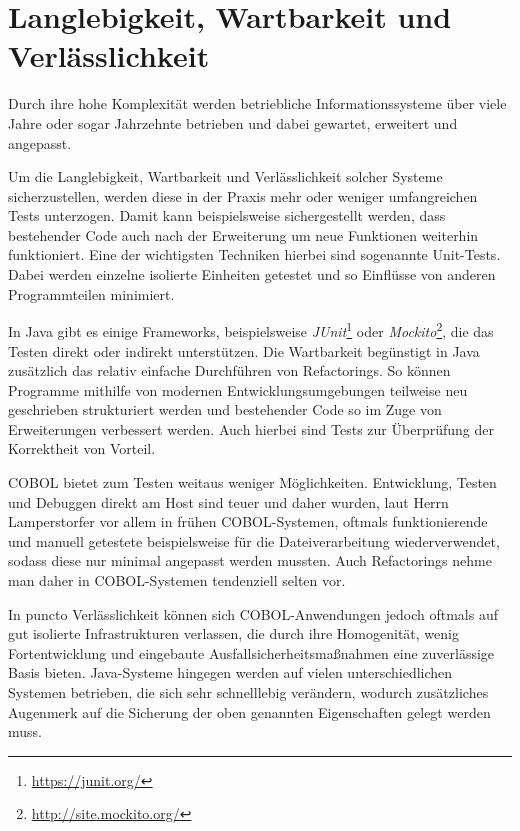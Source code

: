 \section{Langlebigkeit, Wartbarkeit und Verlässlichkeit} \label{verlaesslichkeit}

Durch ihre hohe Komplexität werden betriebliche Informationssysteme \idR über viele Jahre oder sogar Jahrzehnte betrieben und dabei gewartet,  erweitert und angepasst. 

Um die Langlebigkeit, Wartbarkeit und Verlässlichkeit solcher Systeme sicherzustellen, werden diese in der Praxis mehr oder weniger umfangreichen Tests unterzogen. Damit kann beispielsweise sichergestellt werden, dass bestehender Code auch nach der Erweiterung um neue Funktionen weiterhin funktioniert. Eine der wichtigsten Techniken hierbei sind sogenannte Unit-Tests. Dabei werden einzelne isolierte Einheiten getestet und so Einflüsse von anderen Programmteilen minimiert. 

In Java gibt es einige Frameworks, beispielsweise \textit{JUnit}\footnote{\url{https://junit.org/}} oder \textit{Mockito}\footnote{\url{http://site.mockito.org/}}, die das Testen direkt oder indirekt unterstützen. Die Wartbarkeit begünstigt in Java zusätzlich das relativ einfache Durchführen von Refactorings. So können Programme mithilfe von modernen Entwicklungsumgebungen teilweise neu geschrieben \bzw strukturiert werden und bestehender Code so im Zuge von Erweiterungen verbessert werden. Auch hierbei sind Tests zur Überprüfung der Korrektheit von Vorteil. 

COBOL bietet zum Testen weitaus weniger Möglichkeiten. Entwicklung, Testen und Debuggen direkt am Host sind teuer und daher wurden, laut Herrn Lamperstorfer vor allem in frühen COBOL-Systemen, oftmals funktionierende und manuell getestete  beispielsweise für die Dateiverarbeitung wiederverwendet, sodass diese nur minimal angepasst werden mussten. Auch Refactorings nehme man daher in COBOL-Systemen tendenziell selten vor.

In puncto Verlässlichkeit können sich COBOL-Anwendungen jedoch oftmals auf gut isolierte Infrastrukturen verlassen, die durch ihre Homogenität, wenig Fortentwicklung und eingebaute Ausfallsicherheitsmaßnahmen eine zuverlässige Basis bieten. Java-Systeme hingegen werden auf vielen unterschiedlichen Systemen betrieben, die sich sehr schnelllebig verändern, wodurch zusätzliches Augenmerk auf die Sicherung der oben genannten Eigenschaften gelegt werden muss.